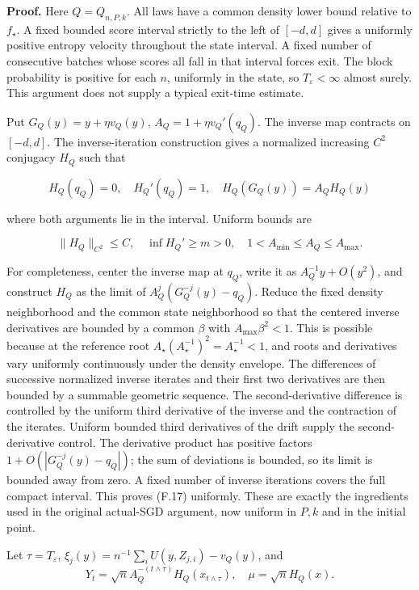 \textbf{Proof.} Here \(Q=Q_{n,P,k}\). All laws have a common density
lower bound relative to \(f_\star\). A fixed bounded score interval
strictly to the left of \([-d,d]\) gives a uniformly positive entropy
velocity throughout the state interval. A fixed number of consecutive
batches whose scores all fall in that interval forces exit. The block
probability is positive for each \(n\), uniformly in the state, so
\(T_\varepsilon<\infty\) almost surely. This argument does not supply a
typical exit-time estimate.

Put \(G_Q(y)=y+\eta v_Q(y)\), \(A_Q=1+\eta v_Q'(q_Q)\). The inverse map
contracts on \([-d,d]\). The inverse-iteration construction gives a
normalized increasing \(C^2\) conjugacy \(H_Q\) such that

\[
H_Q(q_Q)=0,\quad H_Q'(q_Q)=1,\quad
H_Q(G_Q(y))=A_QH_Q(y)
\]

where both arguments lie in the interval. Uniform bounds are

\[
\|H_Q\|_{C^2}\le C,\quad \inf H_Q'\ge m>0,\quad
1<A_{\min}\le A_Q\le A_{\max}.
\tag{F.17}
\]

For completeness, center the inverse map at \(q_Q\), write it as
\(A_Q^{-1}y+O(y^2)\), and construct \(H_Q\) as the limit of
\(A_Q^j(G_Q^{-j}(y)-q_Q)\). Reduce the fixed density neighborhood and
the common state neighborhood so that the centered inverse derivatives
are bounded by a common \(\beta\) with \(A_{\max}\beta^2<1\). This is
possible because at the reference root
\(A_\star(A_\star^{-1})^2=A_\star^{-1}<1\), and roots and derivatives
vary uniformly continuously under the density envelope. The differences
of successive normalized inverse iterates and their first two
derivatives are then bounded by a summable geometric sequence. The
second-derivative difference is controlled by the uniform third
derivative of the inverse and the contraction of the iterates. Uniform
bounded third derivatives of the drift supply the second-derivative
control. The derivative product has positive factors
\(1+O(|G_Q^{-j}(y)-q_Q|)\); the sum of deviations is bounded, so its
limit is bounded away from zero. A fixed number of inverse iterations
covers the full compact interval. This proves (F.17) uniformly. These
are exactly the ingredients used in the original actual-SGD argument,
now uniform in \(P,k\) and in the initial point.

Let \(\tau=T_\varepsilon\),
\(\xi_j(y)=n^{-1}\sum_iU(y,Z_{j,i})-v_Q(y)\), and \[
Y_t=\sqrt n A_Q^{-(t\wedge\tau)}H_Q(x_{t\wedge\tau}),\quad
\mu=\sqrt nH_Q(x).
\]

